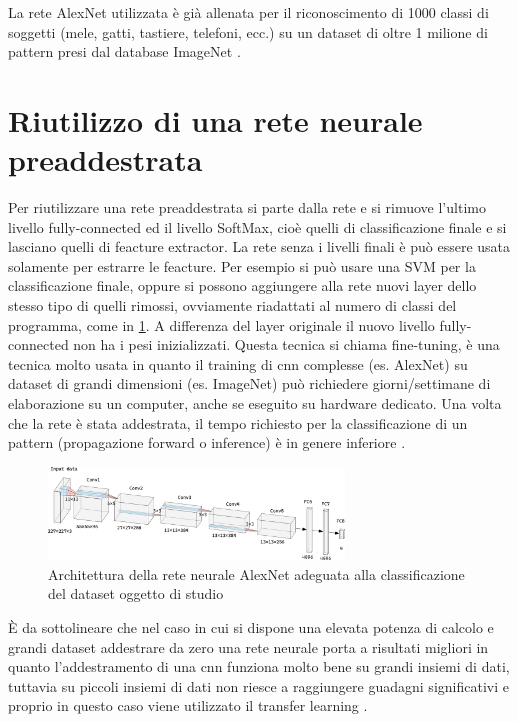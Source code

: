 La rete AlexNet utilizzata è già allenata per il riconoscimento di 1000 classi di soggetti (mele, gatti, tastiere, telefoni, ecc.) su un dataset di oltre 1 milione di pattern presi dal database ImageNet \cite{alexnet}.

\section{Riutilizzo di una rete neurale preaddestrata}\label{riutilizzo-di-una-rete-neurale-preaddestrata}

Per riutilizzare una rete preaddestrata si parte dalla rete e si rimuove l'ultimo livello \gls{fully-connected} ed il livello \gls{SoftMax}, cioè quelli di classificazione finale e si lasciano quelli di feacture extractor. La rete senza i livelli finali è può essere usata solamente per estrarre le feacture. Per esempio si può usare una SVM per la classificazione finale, oppure si possono  aggiungere alla rete nuovi layer dello stesso tipo di quelli rimossi, ovviamente riadattati al numero di classi del programma, come in \cref{fig:alexnet-tl}. A differenza del layer originale il nuovo  livello \gls{fully-connected} non ha i \gls{pesi} inizializzati. Questa tecnica si chiama fine-tuning, è una tecnica molto usata in quanto il training di \gls{cnn} complesse (es. AlexNet) su dataset di grandi dimensioni (es. ImageNet) può richiedere giorni/settimane di elaborazione su un computer, anche se eseguito su hardware dedicato. Una volta che la rete è stata addestrata, il tempo richiesto per la classificazione di un  pattern (\gls{propagazione forward} o inference) è in genere inferiore \cite{yosinski_tl} \cite{unibo_maltoni_ml}.

\begin{figure}[ht]
    \centering
    \includegraphics[width=0.7\textwidth]{addestramento-rete-neurale/alexnet-tl.pdf}
    \caption{Architettura della rete neurale AlexNet adeguata alla classificazione del dataset oggetto di studio}
    \label{fig:alexnet-tl}
\end{figure}

È da sottolineare che nel caso in cui si dispone una elevata potenza di calcolo e grandi dataset addestrare da zero una rete neurale porta a risultati migliori in quanto l'addestramento di una \gls{cnn} funziona molto bene su grandi insiemi di dati, tuttavia su piccoli insiemi di dati non riesce a raggiungere guadagni significativi e proprio in questo caso viene utilizzato il transfer learning \cite{joel_tl}.

